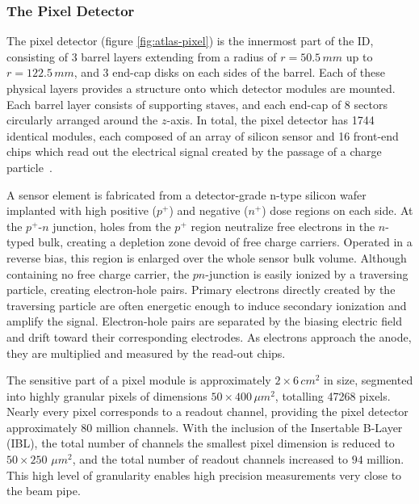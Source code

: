 \subsubsection{The Pixel Detector}
The pixel detector (figure \ref{fig:atlas-pixel}) is the innermost part of the ID, consisting of 3 barrel layers extending from a radius of $r=50.5\, mm$ up to $r=122.5\, mm$, and 3 end-cap disks on each sides of the barrel. Each of these physical layers provides a structure onto which detector modules are mounted. Each barrel layer consists of supporting staves, and each end-cap of 8 sectors circularly arranged around the $z$-axis. In total, the pixel detector has 1744 identical modules, each composed of an array of silicon sensor and 16 front-end chips which read out the electrical signal created by the passage of a charge particle~\cite{front-end-chips}.

A sensor element is fabricated from a detector-grade n-type silicon wafer implanted with high positive ($p^+$) and negative ($n^+$) dose regions on each side. 
At the $p^+$-$n$ junction, holes from the $p^+$ region neutralize free electrons in the $n$-typed bulk, creating a depletion zone devoid of free charge carriers. 
Operated in a reverse bias, this region is enlarged over the whole sensor bulk volume. 
Although containing no free charge carrier, the $pn$-junction is easily ionized by a traversing particle, creating electron-hole pairs. 
Primary electrons directly created by the traversing particle are often energetic enough to induce secondary ionization and amplify the signal. 
Electron-hole pairs are separated by the biasing electric field and drift toward their corresponding electrodes. 
As electrons approach the anode, they are multiplied and measured by the read-out chips.

The sensitive part of a pixel module is approximately $2\times 6\,cm^2$ in size, segmented into highly granular pixels of dimensions $50\times 400 \, \mu m^2$, totalling 47268 pixels. 
Nearly every pixel corresponds to a readout channel, providing the pixel detector approximately 80 million channels. 
With the inclusion of the Insertable B-Layer (IBL), the total number of channels the smallest pixel dimension is reduced to $50\times 250$ $\mu m^2$, and the total number of readout channels increased to $94$ million. 
This high level of granularity enables high precision measurements very close to the beam pipe.

